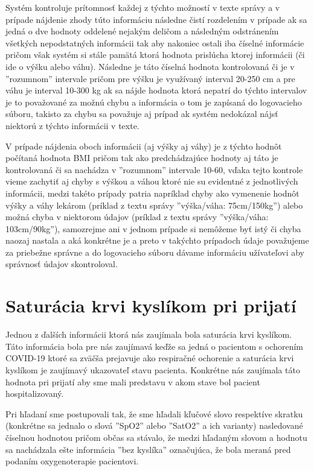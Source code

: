 Systém kontroluje prítomnosť každej z týchto možností v texte správy a v prípade nájdenie zhody túto informáciu následne čistí rozdelením v prípade ak sa jedná o dve hodnoty oddelené nejakým deličom a následným odstránením všetkých nepodstatných informácii tak aby nakoniec ostali iba číselné informácie pričom však systém si stále pamätá ktorá hodnota prislúcha ktorej informácii (či ide o výšku alebo váhu). Následne je táto číselná hodnota kontrolovaná či je v ''rozumnom'' intervale pričom pre výšku je využívaný interval 20-250 cm a pre váhu je interval 10-300 kg ak sa nájde hodnota ktorá nepatrí do týchto intervalov je to považované za možnú chybu a informácia o tom je zapísaná do logovacieho súboru, takisto za chybu sa považuje aj prípad ak systém nedokázal nájsť niektorú z týchto informácii v texte.

V prípade nájdenia oboch informácii (aj výšky aj váhy) je z týchto hodnôt počítaná hodnota BMI pričom tak ako predchádzajúce hodnoty aj táto je kontrolovaná či sa nachádza v ''rozumnom'' intervale 10-60, vďaka tejto kontrole vieme zachytiť aj chyby s výškou a váhou ktoré nie su evidentné z jednotlivých informácii, medzi takéto prípady patria napríklad chyby ako vymenenie hodnôt výšky a váhy lekárom (príklad z textu správy ''výška/váha: 75cm/150kg'') alebo možná chyba v niektorom údajov (príklad z textu správy ''výška/váha: 103cm/90kg''), samozrejme ani v jednom prípade si nemôžeme byť istý či chyba naozaj nastala a aká konkrétne je a preto v takýchto prípadoch údaje považujeme za priebežne správne a do logovacieho súboru dávame informáciu užívateľovi aby správnosť údajov skontroloval. 

\section{Saturácia krvi kyslíkom pri prijatí}
\label{saturacia}

Jednou z ďalších informácii ktorá nás zaujímala bola saturácia krvi kyslíkom. Táto informácia bola pre nás zaujímavá keďže sa jedná o pacientom s ochorením COVID-19 ktoré sa zväčša prejavuje ako respiračné ochorenie a saturácia krvi kyslíkom je zaujímavý ukazovateľ stavu pacienta. Konkrétne nás zaujímala táto hodnota pri prijatí aby sme mali predstavu v akom stave bol pacient hospitalizovaný. 

Pri hľadaní sme postupovali tak, že sme hľadali kľučové slovo respektíve skratku (konkrétne sa jednalo o slová ''SpO2'' alebo ''SatO2'' a ich varianty) nasledované číselnou hodnotou pričom občas sa stávalo, že medzi hľadaným slovom a hodnotu sa nachádzala ešte informácia ''bez kyslíka'' označujúca, že bola meraná pred podaním oxygenoterapie pacientovi.

